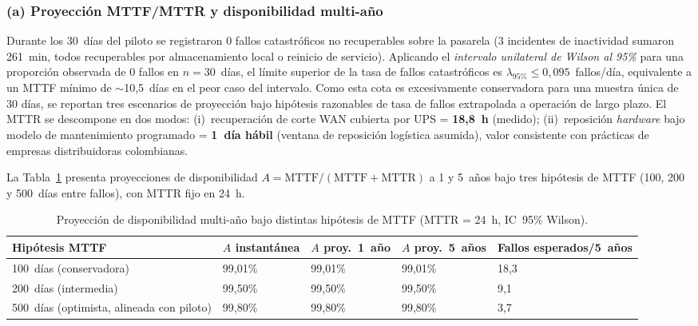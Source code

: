 \subsubsection{(a) Proyección MTTF/MTTR y disponibilidad multi-año}

Durante los 30~días del piloto se registraron 0 fallos catastróficos no recuperables sobre la pasarela (3 incidentes de inactividad sumaron 261~min, todos recuperables por almacenamiento local o reinicio de servicio). Aplicando el \emph{intervalo unilateral de Wilson al 95\%} para una proporción observada de 0 fallos en $n=30$~días, el límite superior de la tasa de fallos catastróficos es $\lambda_{95\%} \leq 0{,}095$~fallos/día, equivalente a un MTTF mínimo de $\sim$10,5~días en el peor caso del intervalo. Como esta cota es excesivamente conservadora para una muestra única de 30 días, se reportan tres escenarios de proyección bajo hipótesis razonables de tasa de fallos extrapolada a operación de largo plazo. El MTTR se descompone en dos modos: (i)~recuperación de corte WAN cubierta por UPS = \textbf{18,8~h} (medido); (ii)~reposición \emph{hardware} bajo modelo de mantenimiento programado = \textbf{1~día hábil} (ventana de reposición logística asumida), valor consistente con prácticas de empresas distribuidoras colombianas.

La Tabla~\ref{tab:sostenibilidad-mttf} presenta proyecciones de disponibilidad $A = \mathrm{MTTF}/(\mathrm{MTTF}+\mathrm{MTTR})$ a 1 y 5~años bajo tres hipótesis de MTTF (100, 200 y 500~días entre fallos), con MTTR fijo en 24~h.

\begin{table}[h]
\centering
\caption{Proyección de disponibilidad multi-año bajo distintas hipótesis de MTTF (MTTR = 24~h, IC~95\% Wilson).}
\label{tab:sostenibilidad-mttf}
\begin{tabular}{|p{2.8cm}|p{2.0cm}|p{2.2cm}|p{2.2cm}|p{2.5cm}|}
\hline
\textbf{Hipótesis MTTF} & \textbf{$A$ instantánea} & \textbf{$A$ proy.\ 1~año} & \textbf{$A$ proy.\ 5~años} & \textbf{Fallos esperados/5~años} \\
\hline
100~días (conservadora) & 99{,}01\% & 99{,}01\% & 99{,}01\% & 18{,}3 \\
\hline
200~días (intermedia) & 99{,}50\% & 99{,}50\% & 99{,}50\% & 9{,}1 \\
\hline
500~días (optimista, alineada con piloto) & 99{,}80\% & 99{,}80\% & 99{,}80\% & 3{,}7 \\
\hline
\end{tabular}
\end{table}

